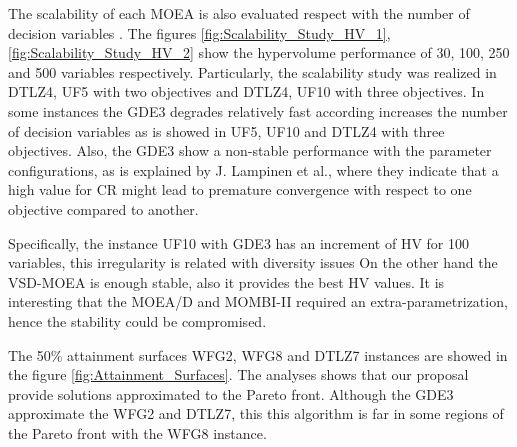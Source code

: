 The scalability of each MOEA is also evaluated respect with the number of decision variables \cite{Joel:ScalabilityStudy}. 
%
The figures \ref{fig:Scalability_Study_HV_1}, \ref{fig:Scalability_Study_HV_2} show the hypervolume performance of 30, 100, 250 and 500 variables respectively.
%
Particularly,  the scalability study was realized in DTLZ4, UF5 with two objectives and DTLZ4, UF10 with three objectives.
%
In some instances the GDE3 degrades relatively fast according increases the number of decision variables as is showed in UF5, UF10 and DTLZ4 with three objectives.
%
Also, the GDE3 show a non-stable performance with the parameter configurations, as is explained by J. Lampinen et al.\cite{Joel:GDE3_CEC09}, where they indicate that a high value for CR might lead to premature convergence with respect to one objective compared to another.

%
Specifically, the instance UF10 with GDE3 has an increment of HV for 100 variables, this irregularity is related with diversity issues \cite{Joel:GDE3_CEC09}
%
On the other hand the VSD-MOEA is enough stable, also it provides the best HV values.
%
It is interesting that the MOEA/D and MOMBI-II required an extra-parametrization, hence the stability could be compromised.

%
The 50\% attainment surfaces WFG2, WFG8 and DTLZ7 instances are showed in the figure \ref{fig:Attainment_Surfaces}.
%
The analyses shows that our proposal provide solutions approximated to the Pareto front.
%
Although the GDE3 approximate the WFG2 and DTLZ7, this this algorithm is far in some regions of the Pareto front with the WFG8 instance. 

